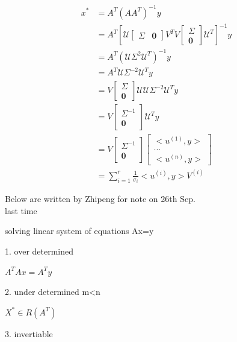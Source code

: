 \begin{align*}
x^* &= A^T(AA^T)^{-1}y\\
&= A^T\left[\mathcal{U}
\begin{bmatrix}
\Sigma & \mathbf{0}
\end{bmatrix}
V^TV
\begin{bmatrix}
\Sigma\\
\mathbf{0}
\end{bmatrix}
\mathcal{U}^T\right]^{-1}y\\
&= A^T(\mathcal{U}\Sigma^2\mathcal{U}^T)^{-1}y\\
&= A^T\mathcal{U}\Sigma^{-2}\mathcal{U}^Ty\\
&= V
\begin{bmatrix}
\Sigma\\
\mathbf{0}
\end{bmatrix}
\mathcal{U}\mathcal{U}\Sigma^{-2}\mathcal{U}^Ty\\
&=V
\begin{bmatrix}
\Sigma^{-1} \\
\mathbf{0}
\end{bmatrix}
\mathcal{U}^Ty\\
&= V
\begin{bmatrix}
\Sigma^{-1}\\
\mathbf{0}
\end{bmatrix}
\begin{bmatrix}
<u^{(1)}, y>\\
...\\
<u^{(n)}, y>
\end{bmatrix}\\
&= \sum^r_{i=1}\frac{1}{\sigma_i}<u^{(i)}, y>V^{(i)}
\end{align*}











Below are written by Zhipeng for note on 26th Sep. \\


last time

solving linear system of equations Ax=y

1. over determined

$A^TAx=A^Ty$


2. under determined m<n

$X^* \in R(A^T)  $ 

3. invertiable





